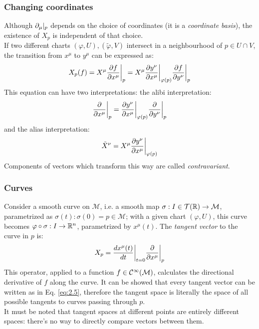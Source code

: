 \subsubsection{Changing coordinates}

Although $ \partial_{\mu}\vert_p $ depends on the choice of coordinates (it is a \textit{coordinate basis}), the existence of $ X_p $ is independent of that choice.\\
If two different charts $ (\varphi,U),(\tilde{\varphi},V) $ intersect in a neighbourhood of $ p \in U \cap V $, the transition from $ x^{\mu} $ to $ y^{\mu} $ can be expressed as:
\begin{equation}
  X_p(f) = X^{\mu} \frac{\partial f}{\partial x^{\mu}}\bigg\vert_p = X^{\mu} \frac{\partial y^{\nu}}{\partial x^{\mu}}\bigg\vert_{\varphi(p)} \frac{\partial f}{\partial y^{\nu}}\bigg\vert_p
\end{equation}
This equation can have two interpretations: the alibi interpretation:
\begin{equation}
  \frac{\partial}{\partial x^{\mu}}\bigg\vert_p = \frac{\partial y^{\nu}}{\partial x^{\mu}}\bigg\vert_{\varphi(p)} \frac{\partial}{\partial y^{\nu}}\bigg\vert_p
  \label{eq:2.3}
\end{equation}
and the alias interpretation:
\begin{equation}
  \tilde{X}^{\nu} = X^{\mu} \frac{\partial y^{\nu}}{\partial x^{\mu}}\bigg\vert_{\varphi(p)}
  \label{eq:2.4}
\end{equation}
Components of vectors which transform this way are called \textit{contravariant}.

\subsubsection{Curves}

Consider a smooth curve on $ \mathcal{M} $, i.e. a smooth map $ \sigma : I \in \mathcal{T}(\mathbb{R}) \rightarrow \mathcal{M} $, parametrized as $ \sigma(t) : \sigma(0) = p \in \mathcal{M} $; with a given chart $ (\varphi,U) $, this curve becomes $ \varphi \circ \sigma : I \rightarrow \mathbb{R}^n $, parametrized by $ x^{\mu}(t) $.
The \textit{tangent vector} to the curve in $ p $ is:
\begin{equation}
  X_p = \frac{dx^{\mu}(t)}{dt}\bigg\vert_{t=0} \frac{\partial}{\partial x^{\mu}}\bigg\vert_p
  \label{eq:2.5}
\end{equation}
This operator, applied to a function $ f \in\mathcal{C}^{\infty}(\mathcal{M}) $, calculates the directional derivative of $ f $ along the curve. It can be showed that every tangent vector can be written as in Eq. \ref{eq:2.5}, therefore the tangent space is literally the space of all possible tangents to curves passing through $ p $.\\
It must be noted that tangent spaces at different points are entirely different spaces: there's no way to directly compare vectors between them.

